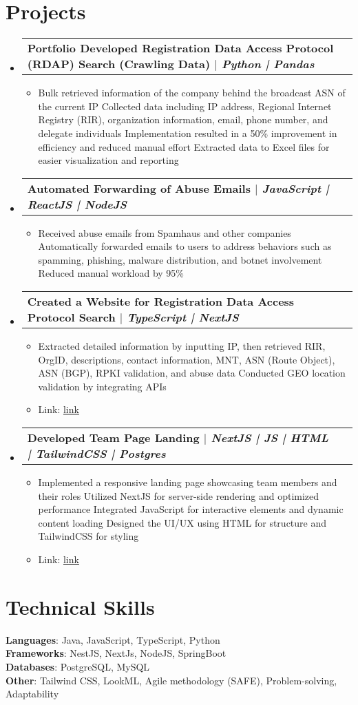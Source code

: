 \documentclass[letterpaper,11pt]{article}
\makeatletter
\newcommand{\resumeItem}[1]{
  \item\small{
    {#1 \vspace{-2pt}}
  }
}
\newcommand{\resumeProjectHeading}[2]{
    \item
    \begin{tabular*}{0.97\textwidth}{l@{\extracolsep{\fill}}r}
      \small#1 & #2 \\
    \end{tabular*}\vspace{-7pt}
}
\newcommand{\resumeSubHeadingListStart}{\begin{itemize}[leftmargin=0.15in, label={}]}
\newcommand{\resumeSubHeadingListEnd}{\end{itemize}}
\newcommand{\resumeItemListStart}{\begin{itemize}}
\newcommand{\resumeItemListEnd}{\end{itemize}\vspace{-5pt}}
\makeatother
\begin{document}
\section{Projects}
    \resumeSubHeadingListStart
      \resumeProjectHeading
          {\textbf{Portfolio Developed Registration Data Access Protocol (RDAP) Search (Crawling Data) $|$ \emph{Python | Pandas}}}{}
          \resumeItemListStart
            \resumeItem{Bulk retrieved information of the company behind the broadcast ASN of the current IP
Collected data including IP address, Regional Internet Registry (RIR), organization information, email, phone number, and delegate individuals
Implementation resulted in a 50\% improvement in efficiency and reduced manual effort
Extracted data to Excel files for easier visualization and reporting}
          \resumeItemListEnd
      \resumeProjectHeading
          {\textbf{Automated Forwarding of Abuse Emails $|$ \emph{JavaScript | ReactJS | NodeJS}}}{}
          \resumeItemListStart
            \resumeItem{Received abuse emails from Spamhaus and other companies
Automatically forwarded emails to users to address behaviors such as spamming, phishing, malware distribution, and botnet involvement
Reduced manual workload by 95\%}
          \resumeItemListEnd
      \resumeProjectHeading
          {\textbf{Created a Website for Registration Data Access Protocol Search $|$ \emph{TypeScript | NextJS}}}{}
          \resumeItemListStart
            \resumeItem{Extracted detailed information by inputting IP, then retrieved RIR, OrgID, descriptions, contact information, MNT, ASN (Route Object), ASN (BGP), RPKI validation, and abuse data
Conducted GEO location validation by integrating APIs}
            \resumeItem{Link: \href{link}{\underline{link}}}
          \resumeItemListEnd
      \resumeProjectHeading
          {\textbf{Developed Team Page Landing $|$ \emph{NextJS | JS | HTML | TailwindCSS | Postgres}}}{}
          \resumeItemListStart
            \resumeItem{Implemented a responsive landing page showcasing team members and their roles
Utilized NextJS for server-side rendering and optimized performance
Integrated JavaScript for interactive elements and dynamic content loading
Designed the UI/UX using HTML for structure and TailwindCSS for styling}
            \resumeItem{Link: \href{link}{\underline{link}}}
          \resumeItemListEnd
    \resumeSubHeadingListEnd

\section{Technical Skills}
 \begin{itemize}[leftmargin=0.15in, label={}]
    \small{\item{
     \textbf{Languages}: Java, JavaScript, TypeScript, Python \\
     \textbf{Frameworks}: NestJS, NextJs, NodeJS, SpringBoot \\
     \textbf{Databases}: PostgreSQL, MySQL \\
     \textbf{Other}: Tailwind CSS, LookML, Agile methodology (SAFE), Problem-solving, Adaptability
    }}
 \end{itemize}
\end{document}
